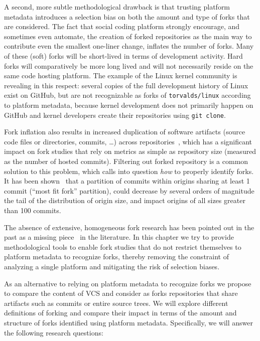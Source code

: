 A second, more subtle methodological drawback is that trusting platform
metadata introduces a selection bias on both the amount and type of forks that
are considered. The fact that social coding platform strongly encourage, and
sometimes even automate, the creation of forked repositories as the main way to
contribute even the smallest one-liner change, inflates the number of forks.
Many of these (soft) forks will be short-lived in terms of development
activity. Hard forks will comparatively be more long lived and will not
necessarily reside on the same code hosting platform. The example of the Linux
kernel community is revealing in this respect: several copies of the full
development history of Linux exist on GitHub, but are not recognizable as forks
of \texttt{torvalds/linux} according to platform metadata, because kernel
development does not primarily happen on GitHub and kernel developers create
their repositories using \texttt{git clone}.

Fork inflation also results in increased duplication of software artifacts
(source code files or directories, commits, \ldots) across
repositories~\cite{swh-provenance-emse}, which has a significant impact on fork
studies that rely on metrics as simple as repository size (measured as the
number of hosted commits). Filtering out forked repository is a common solution
to this problem, which calls into question \emph{how} to properly identify
forks.
It has been shown~\cite{swh-provenance-emse} that a partition of commits within
origins sharing at least 1 commit (``most fit fork'' partition), could decrease
by several orders of magnitude the tail of the distribution of origin size, and
impact origins of all sizes greater than 100 commits.

\smallskip

The absence of extensive, homogeneous fork research has been pointed out in the
past as a missing piece~\cite{robles2012forks} in the literature. In this
chapter we try to provide methodological tools to enable fork studies that do
not restrict themselves to platform metadata to recognize forks, thereby
removing the constraint of analyzing a single platform and mitigating the risk
of selection biases.

As an alternative to relying on platform metadata to recognize forks we propose
to compare the content of VCS and consider as forks repositories that share
artifacts such as commits or entire source trees. We will explore different
definitions of forking and compare their impact in terms of the amount and
structure of forks identified using platform metadata. Specifically, we will
answer the following research questions:

